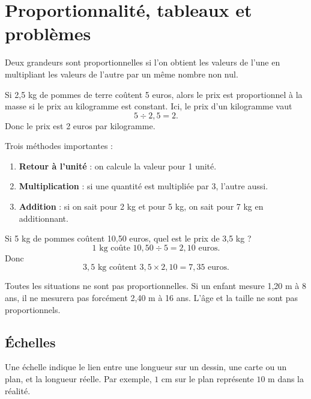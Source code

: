 \documentclass[11pt,a4paper]{article}
\begin{document}
\section{Proportionnalité, tableaux et problèmes}

\begin{definitionbox}
Deux grandeurs sont proportionnelles si l'on obtient les valeurs de l'une en multipliant les valeurs de l'autre par un même nombre non nul.
\end{definitionbox}

\begin{exemplebox}
Si 2,5 kg de pommes de terre coûtent 5 euros, alors le prix est proportionnel à la masse si le prix au kilogramme est constant. Ici, le prix d'un kilogramme vaut
\[
5\div2,5=2.
\]
Donc le prix est 2 euros par kilogramme.
\end{exemplebox}

\begin{methodbox}
Trois méthodes importantes :
\begin{enumerate}[label=\arabic*)]
\item \textbf{Retour à l'unité} : on calcule la valeur pour 1 unité.
\item \textbf{Multiplication} : si une quantité est multipliée par 3, l'autre aussi.
\item \textbf{Addition} : si on sait pour 2 kg et pour 5 kg, on sait pour 7 kg en additionnant.
\end{enumerate}
\end{methodbox}

\begin{exemplebox}
Si 5 kg de pommes coûtent 10,50 euros, quel est le prix de 3,5 kg ?
\[
1\text{ kg coûte }10,50\div5=2,10\text{ euros}.
\]
Donc
\[
3,5\text{ kg coûtent }3,5\times2,10=7,35\text{ euros}.
\]
\end{exemplebox}

\begin{erreurbox}
Toutes les situations ne sont pas proportionnelles. Si un enfant mesure 1,20 m à 8 ans, il ne mesurera pas forcément 2,40 m à 16 ans. L'âge et la taille ne sont pas proportionnels.
\end{erreurbox}

\subsection{Échelles}

\begin{definitionbox}
Une échelle indique le lien entre une longueur sur un dessin, une carte ou un plan, et la longueur réelle. Par exemple, \(1\) cm sur le plan représente \(10\) m dans la réalité.
\end{definitionbox}
\end{document}
